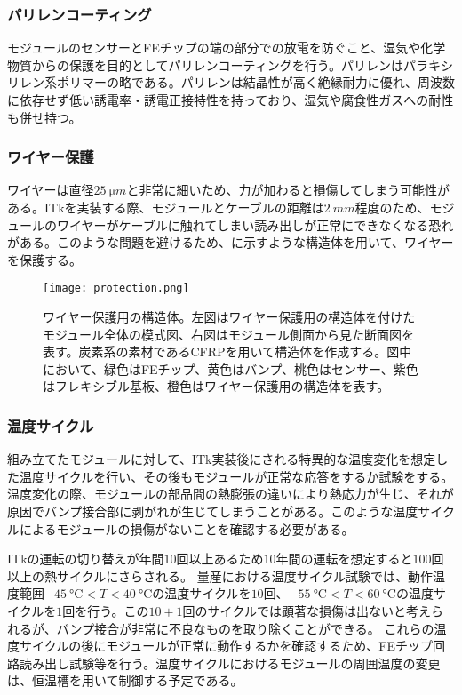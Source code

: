 \subsubsection*{パリレンコーティング}

モジュールのセンサーとFEチップの端の部分での放電を防ぐこと、湿気や化学物質からの保護を目的としてパリレンコーティングを行う。パリレンはパラキシリレン系ポリマーの略である。パリレンは結晶性が高く絶縁耐力に優れ、周波数に依存せず低い誘電率・誘電正接特性を持っており、湿気や腐食性ガスへの耐性も併せ持つ。


\subsubsection*{ワイヤー保護}

ワイヤーは直径$25\ \si{\micro m}$と非常に細いため、力が加わると損傷してしまう可能性がある。ITkを実装する際、モジュールとケーブルの距離は$2\ \si{mm}$程度のため、モジュールのワイヤーがケーブルに触れてしまい読み出しが正常にできなくなる恐れがある。このような問題を避けるため、に示すような構造体を用いて、ワイヤーを保護する。

\begin{figure}[tbp]
  \centering
  \texttt{[image: protection.png]}
  \caption[ワイヤー保護用の構造体]{ワイヤー保護用の構造体。左図はワイヤー保護用の構造体を付けたモジュール全体の模式図、右図はモジュール側面から見た断面図を表す。炭素系の素材であるCFRPを用いて構造体を作成する。図中において、緑色はFEチップ、黄色はバンプ、桃色はセンサー、紫色はフレキシブル基板、橙色はワイヤー保護用の構造体を表す。 }
  \label{fig:protection}
\end{figure}

\subsubsection*{温度サイクル}

組み立てたモジュールに対して、ITk実装後にされる特異的な温度変化を想定した温度サイクルを行い、その後もモジュールが正常な応答をするか試験をする。温度変化の際、モジュールの部品間の熱膨張の違いにより熱応力が生じ、それが原因でバンプ接合部に剥がれが生じてしまうことがある。このような温度サイクルによるモジュールの損傷がないことを確認する必要がある。

ITkの運転の切り替えが年間$10$回以上あるため$10$年間の運転を想定すると$100$回以上の熱サイクルにさらされる。
量産における温度サイクル試験では、動作温度範囲$-45\ \si{\degreeCelsius}<T<40\ \si{\degreeCelsius}$の温度サイクルを$10$回、$-55\ \si{\degreeCelsius}<T<60\ \si{\degreeCelsius}$の温度サイクルを$1$回を行う。この$10+1$回のサイクルでは顕著な損傷は出ないと考えられるが、バンプ接合が非常に不良なものを取り除くことができる。
これらの温度サイクルの後にモジュールが正常に動作するかを確認するため、FEチップ回路読み出し試験等を行う。温度サイクルにおけるモジュールの周囲温度の変更は、恒温槽を用いて制御する予定である。

